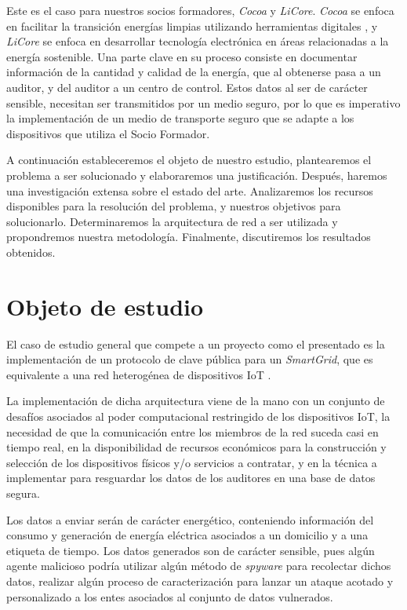 \documentclass{article}
\begin{document}
        Este es el caso para nuestros socios formadores, \textit{Cocoa} y \textit{LiCore}. \textit{Cocoa} se enfoca en facilitar la transición energías limpias utilizando herramientas digitales \cite{cocoa}, y  \textit{LiCore} se enfoca en desarrollar tecnología electrónica en áreas relacionadas a la energía sostenible. Una parte clave en su proceso consiste en documentar información de la cantidad y calidad de la energía, que al obtenerse pasa a un auditor, y del auditor a un centro de control. Estos datos al ser de carácter sensible, necesitan ser transmitidos por un medio seguro, por lo que es imperativo la implementación de un medio de transporte seguro que se adapte a los dispositivos que utiliza el Socio Formador.

        A continuación estableceremos el objeto de nuestro estudio, plantearemos el problema a ser solucionado y elaboraremos una justificación. Después, haremos una investigación extensa sobre el estado del arte. Analizaremos los recursos disponibles para la resolución del problema, y nuestros objetivos para solucionarlo. Determinaremos la arquitectura de red a ser utilizada y propondremos nuestra metodología. Finalmente, discutiremos los resultados obtenidos.

    \section{Objeto de estudio}

        El caso de estudio general que compete a un proyecto como el presentado es la implementación de un protocolo de clave pública para un \textit{SmartGrid}, que es equivalente a una red heterogénea de dispositivos IoT \cite{smart_grid_def}.

        La implementación de dicha arquitectura viene de la mano con un conjunto de desafíos asociados al poder computacional restringido de los dispositivos IoT, la necesidad de que la comunicación entre los miembros de la red suceda casi en tiempo real, en la disponibilidad de recursos económicos para la construcción y selección de los dispositivos físicos y/o servicios a contratar, y en la técnica a implementar para resguardar los datos de los auditores en una base de datos segura.

        Los datos a enviar serán de carácter energético, conteniendo información del consumo y generación de energía eléctrica asociados a un domicilio y a una etiqueta de tiempo. Los datos generados son de carácter sensible, pues algún agente malicioso podría utilizar algún método de \textit{spyware} para recolectar dichos datos, realizar algún proceso de caracterización para lanzar un ataque acotado y personalizado a los entes asociados al conjunto de datos vulnerados.
\end{document}
